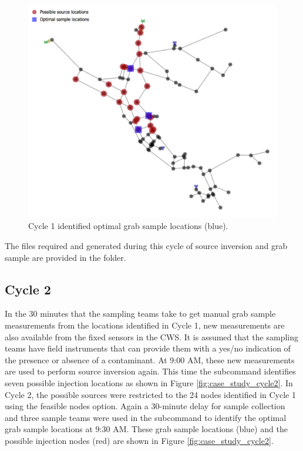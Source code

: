 \begin{figure}[!ht]
\begin{center}
\includegraphics[scale=0.6]{graphics/inversion_cs_cycle1.pdf}
\caption{Cycle 1 identified optimal grab sample locations (blue).}
\label{fig:case_study_cycle1}
\end{center}
\end{figure}

The files required and generated during this cycle of source inversion and grab sample 
are provided in the  folder. 

\subsection{Cycle 2}
In the 30 minutes that the sampling teams take to get manual grab sample measurements from the locations identified in Cycle 1, 
new measurements are also available from the fixed sensors in the CWS. It is assumed that
the sampling teams have field instruments that can provide them with a yes/no indication of the
presence or absence of a contaminant.  
At 9:00 AM, these new measurements are used to perform source inversion again. 
This time the  subcommand identifies seven possible injection locations as shown in Figure \ref{fig:case_study_cycle2}. 
In Cycle 2, the possible sources were restricted to the 24 nodes identified in Cycle 1 using the feasible nodes option. 
Again a 30-minute delay for sample collection and three sample teams were used in the  subcommand to identify 
the optimal grab sample locations at 9:30 AM. These grab sample locations (blue) and 
the possible injection nodes (red) are shown in Figure \ref{fig:case_study_cycle2}.

